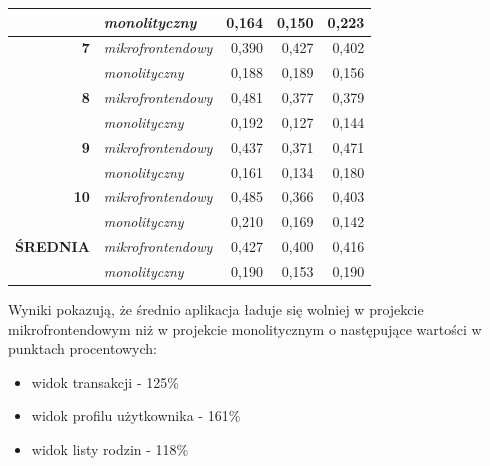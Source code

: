 \documentclass{SGGW-thesis}
\begin{document}
\begin{table}[]
\begin{tabular}{ll|rrr|}
      \multicolumn{1}{|l|}{\textbf{}} & \textit{monolityczny} & \multicolumn{1}{r|}{0,164} & \multicolumn{1}{r|}{0,150} & 0,223 \\ \hline
      \multicolumn{1}{|r|}{\textbf{7}} & \textit{mikrofrontendowy} & \multicolumn{1}{r|}{0,390} & \multicolumn{1}{r|}{0,427} & 0,402 \\ \hline
      \multicolumn{1}{|l|}{\textbf{}} & \textit{monolityczny} & \multicolumn{1}{r|}{0,188} & \multicolumn{1}{r|}{0,189} & 0,156 \\ \hline
      \multicolumn{1}{|r|}{\textbf{8}} & \textit{mikrofrontendowy} & \multicolumn{1}{r|}{0,481} & \multicolumn{1}{r|}{0,377} & 0,379 \\ \hline
      \multicolumn{1}{|l|}{\textbf{}} & \textit{monolityczny} & \multicolumn{1}{r|}{0,192} & \multicolumn{1}{r|}{0,127} & 0,144 \\ \hline
      \multicolumn{1}{|r|}{\textbf{9}} & \textit{mikrofrontendowy} & \multicolumn{1}{r|}{0,437} & \multicolumn{1}{r|}{0,371} & 0,471 \\ \hline
      \multicolumn{1}{|l|}{\textbf{}} & \textit{monolityczny} & \multicolumn{1}{r|}{0,161} & \multicolumn{1}{r|}{0,134} & 0,180 \\ \hline
      \multicolumn{1}{|r|}{\textbf{10}} & \textit{mikrofrontendowy} & \multicolumn{1}{r|}{0,485} & \multicolumn{1}{r|}{0,366} & 0,403 \\ \hline
      \multicolumn{1}{|l|}{\textbf{}} & \textit{monolityczny} & \multicolumn{1}{r|}{0,210} & \multicolumn{1}{r|}{0,169} & 0,142 \\ \hline\hline
      \multicolumn{1}{|l|}{\textbf{ŚREDNIA}} & \textit{mikrofrontendowy} & \multicolumn{1}{r|}{0,427} & \multicolumn{1}{r|}{0,400} & 0,416 \\ \hline
      \multicolumn{1}{l|}{} & \textit{monolityczny} & \multicolumn{1}{r|}{0,190} & \multicolumn{1}{r|}{0,153} & 0,190 \\ \cline{2-5} 
      \end{tabular}
      \label{table:runtimes_with_cache}
    \end{table}

    Wyniki pokazują, że średnio aplikacja ładuje się wolniej w projekcie mikrofrontendowym niż w projekcie monolitycznym o następujące wartości w punktach procentowych:

    \begin{itemize}
      \item widok transakcji - 125\%
      \item widok profilu użytkownika - 161\%
      \item widok listy rodzin - 118\%
    \end{itemize}
\end{document}
